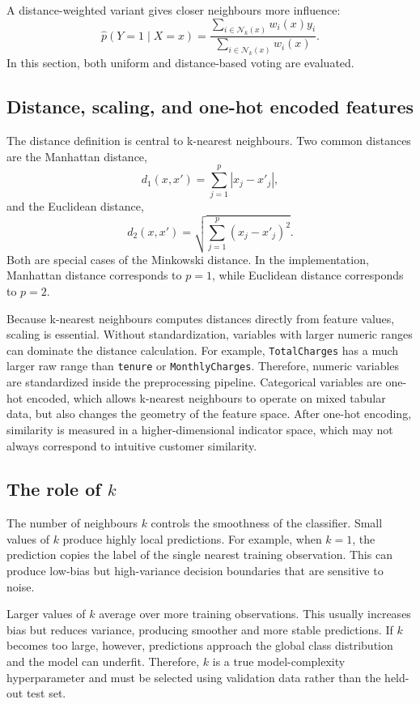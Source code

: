 A distance-weighted variant gives closer neighbours more influence:
\[
\widehat{p}(Y=1 \mid X=x)
=
\frac{
\sum_{i \in \mathcal{N}_k(x)} w_i(x)y_i
}{
\sum_{i \in \mathcal{N}_k(x)} w_i(x)
}.
\]
In this section, both uniform and distance-based voting are evaluated.

\subsection{Distance, scaling, and one-hot encoded features}

The distance definition is central to k-nearest neighbours. Two common distances are the Manhattan distance,
\[
d_1(x,x')
=
\sum_{j=1}^{p}
|x_j-x'_j|,
\]
and the Euclidean distance,
\[
d_2(x,x')
=
\sqrt{
\sum_{j=1}^{p}
(x_j-x'_j)^2
}.
\]
Both are special cases of the Minkowski distance. In the implementation, Manhattan distance corresponds to \(p=1\), while Euclidean distance corresponds to \(p=2\).

Because k-nearest neighbours computes distances directly from feature values, scaling is essential. Without standardization, variables with larger numeric ranges can dominate the distance calculation. For example, \texttt{TotalCharges} has a much larger raw range than \texttt{tenure} or \texttt{MonthlyCharges}. Therefore, numeric variables are standardized inside the preprocessing pipeline. Categorical variables are one-hot encoded, which allows k-nearest neighbours to operate on mixed tabular data, but also changes the geometry of the feature space. After one-hot encoding, similarity is measured in a higher-dimensional indicator space, which may not always correspond to intuitive customer similarity.

\subsection{The role of \(k\)}

The number of neighbours \(k\) controls the smoothness of the classifier. Small values of \(k\) produce highly local predictions. For example, when \(k=1\), the prediction copies the label of the single nearest training observation. This can produce low-bias but high-variance decision boundaries that are sensitive to noise.

Larger values of \(k\) average over more training observations. This usually increases bias but reduces variance, producing smoother and more stable predictions. If \(k\) becomes too large, however, predictions approach the global class distribution and the model can underfit. Therefore, \(k\) is a true model-complexity hyperparameter and must be selected using validation data rather than the held-out test set.


